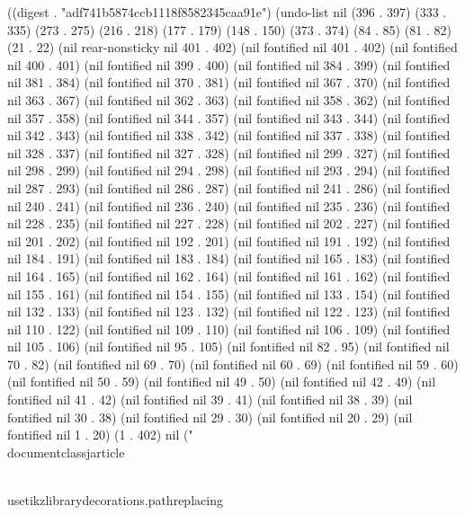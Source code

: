 ((digest . "adf741b5874ccb1118f8582345caa91e") (undo-list nil (396 . 397) (333 . 335) (273 . 275) (216 . 218) (177 . 179) (148 . 150) (373 . 374) (84 . 85) (81 . 82) (21 . 22) (nil rear-nonsticky nil 401 . 402) (nil fontified nil 401 . 402) (nil fontified nil 400 . 401) (nil fontified nil 399 . 400) (nil fontified nil 384 . 399) (nil fontified nil 381 . 384) (nil fontified nil 370 . 381) (nil fontified nil 367 . 370) (nil fontified nil 363 . 367) (nil fontified nil 362 . 363) (nil fontified nil 358 . 362) (nil fontified nil 357 . 358) (nil fontified nil 344 . 357) (nil fontified nil 343 . 344) (nil fontified nil 342 . 343) (nil fontified nil 338 . 342) (nil fontified nil 337 . 338) (nil fontified nil 328 . 337) (nil fontified nil 327 . 328) (nil fontified nil 299 . 327) (nil fontified nil 298 . 299) (nil fontified nil 294 . 298) (nil fontified nil 293 . 294) (nil fontified nil 287 . 293) (nil fontified nil 286 . 287) (nil fontified nil 241 . 286) (nil fontified nil 240 . 241) (nil fontified nil 236 . 240) (nil fontified nil 235 . 236) (nil fontified nil 228 . 235) (nil fontified nil 227 . 228) (nil fontified nil 202 . 227) (nil fontified nil 201 . 202) (nil fontified nil 192 . 201) (nil fontified nil 191 . 192) (nil fontified nil 184 . 191) (nil fontified nil 183 . 184) (nil fontified nil 165 . 183) (nil fontified nil 164 . 165) (nil fontified nil 162 . 164) (nil fontified nil 161 . 162) (nil fontified nil 155 . 161) (nil fontified nil 154 . 155) (nil fontified nil 133 . 154) (nil fontified nil 132 . 133) (nil fontified nil 123 . 132) (nil fontified nil 122 . 123) (nil fontified nil 110 . 122) (nil fontified nil 109 . 110) (nil fontified nil 106 . 109) (nil fontified nil 105 . 106) (nil fontified nil 95 . 105) (nil fontified nil 82 . 95) (nil fontified nil 70 . 82) (nil fontified nil 69 . 70) (nil fontified nil 60 . 69) (nil fontified nil 59 . 60) (nil fontified nil 50 . 59) (nil fontified nil 49 . 50) (nil fontified nil 42 . 49) (nil fontified nil 41 . 42) (nil fontified nil 39 . 41) (nil fontified nil 38 . 39) (nil fontified nil 30 . 38) (nil fontified nil 29 . 30) (nil fontified nil 20 . 29) (nil fontified nil 1 . 20) (1 . 402) nil ("\\documentclass{jarticle}
\begin{document}
 \\usetikzlibrary{decorations.pathreplacing}


 
 
 
 
 



\end{document}
